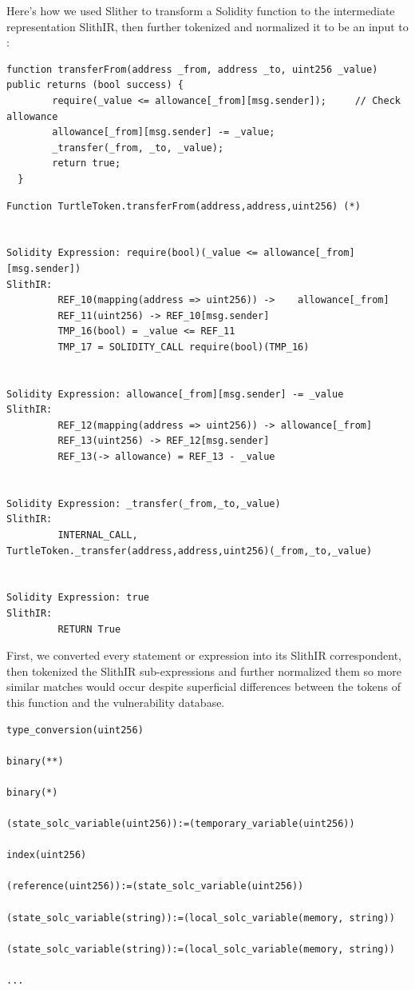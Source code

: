 Here's how we used Slither to transform a Solidity function to the intermediate representation SlithIR, then further tokenized and normalized it to be an input to \slithersimil:

\begin{lstlisting}[float,caption= complete Solidity function from the contract TurtleToken.sol., escapechar=\%, language=Solidity, label=lst:solidity-bug]
  function transferFrom(address _from, address _to, uint256 _value) public returns (bool success) {
        require(_value <= allowance[_from][msg.sender]);     // Check allowance
        allowance[_from][msg.sender] -= _value;
        _transfer(_from, _to, _value);
        return true;
  }
  \end{lstlisting}

  \begin{lstlisting}[float,caption= The same function with its SlithIR expressions printed out., escapechar=\%, language=Solidity, label=lst:solidity-bug]
Function TurtleToken.transferFrom(address,address,uint256) (*)
 
 
Solidity Expression: require(bool)(_value <= allowance[_from][msg.sender])
SlithIR: 
         REF_10(mapping(address => uint256)) ->    allowance[_from]
         REF_11(uint256) -> REF_10[msg.sender]
         TMP_16(bool) = _value <= REF_11
         TMP_17 = SOLIDITY_CALL require(bool)(TMP_16)
 
 
Solidity Expression: allowance[_from][msg.sender] -= _value
SlithIR: 
         REF_12(mapping(address => uint256)) -> allowance[_from]
         REF_13(uint256) -> REF_12[msg.sender]
         REF_13(-> allowance) = REF_13 - _value
 
 
Solidity Expression: _transfer(_from,_to,_value)
SlithIR: 
         INTERNAL_CALL,      TurtleToken._transfer(address,address,uint256)(_from,_to,_value)
 
 
Solidity Expression: true
SlithIR: 
         RETURN True
    \end{lstlisting}


First, we converted every statement or expression into its SlithIR correspondent, then tokenized the SlithIR sub-expressions and further normalized them so more similar matches would occur
despite superficial differences between the tokens of this function and the vulnerability database.

\begin{lstlisting}[float,caption= Normalized SlithIR tokens of the previous expressions., escapechar=\%, language=Solidity, label=lst:solidity-bug]
type_conversion(uint256)
 
binary(**)
 
binary(*)
 
(state_solc_variable(uint256)):=(temporary_variable(uint256))
 
index(uint256)
 
(reference(uint256)):=(state_solc_variable(uint256))
 
(state_solc_variable(string)):=(local_solc_variable(memory, string))
 
(state_solc_variable(string)):=(local_solc_variable(memory, string))
 
...
  \end{lstlisting}

